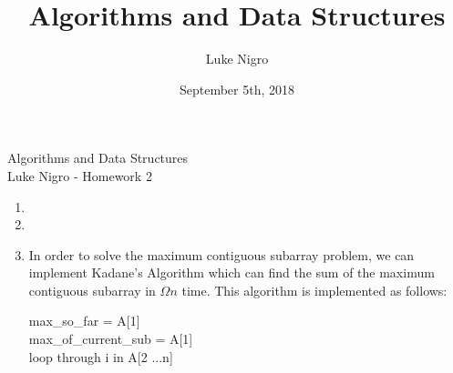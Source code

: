 \documentclass{article}
\author{Luke Nigro}
\title{Algorithms and Data Structures}
\date{September 5th, 2018}
\begin{document}
\centering \Huge Algorithms and Data Structures \\
\Large Luke Nigro - Homework 2 \\
\begin{flushleft}
\begin{enumerate}
\setlength\itemsep{2em}

\item

\item

\item
In order to solve the maximum contiguous subarray problem, we can implement Kadane's Algorithm which can find the sum of the maximum contiguous subarray in $\Omega{n}$ time.
This algorithm is implemented as follows:\par
\bigskip
max_so_far = A[1]\\
max_of_current_sub = A[1]\\

loop through i in A[2 ...n]\\


\end{enumerate}
\end{flushleft}
\end{document}
